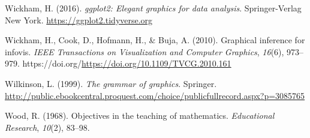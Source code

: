 \documentclass[
  10pt,
]{article}
\newlength{\cslhangindent}
\newenvironment{CSLReferences}[2] %
 {\begin{list}{}{%
  \setlength{\itemindent}{0pt}
  \setlength{\leftmargin}{0pt}
  \setlength{\parsep}{0pt}
  \ifodd #1
   \setlength{\leftmargin}{\cslhangindent}
   \setlength{\itemindent}{-1\cslhangindent}
  \fi
  \setlength{\itemsep}{#2\baselineskip}}}
 {\end{list}}
\begin{document}
\begin{CSLReferences}{1}{0}
Wickham, H. (2016). \emph{ggplot2: Elegant graphics for data analysis}.
Springer-Verlag New York. \url{https://ggplot2.tidyverse.org}

Wickham, H., Cook, D., Hofmann, H., \& Buja, A. (2010). Graphical
inference for infovis. \emph{IEEE Transactions on Visualization and
Computer Graphics}, \emph{16}(6), 973--979.
https://doi.org/\url{https://doi.org/10.1109/TVCG.2010.161}

Wilkinson, L. (1999). \emph{The grammar of graphics}. Springer.
\url{http://public.ebookcentral.proquest.com/choice/publicfullrecord.aspx?p=3085765}

Wood, R. (1968). Objectives in the teaching of mathematics.
\emph{Educational Research}, \emph{10}(2), 83--98.

\end{CSLReferences}
\end{document}
